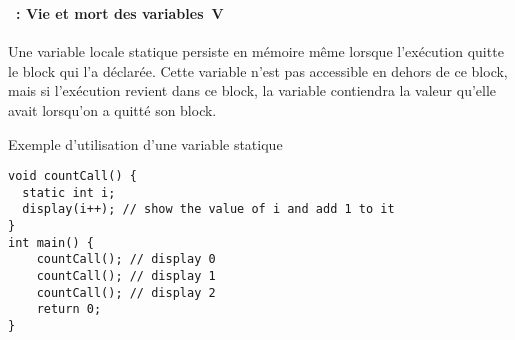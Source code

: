 \begin{frame}[containsverbatim]
  \frametitle{\secname}
  \framesubtitle{\subsecname~: Vie et mort des variables~V}
  
  {\small Une variable locale statique persiste en mémoire même lorsque l'exécution quitte le block qui l'a déclarée. 
  Cette variable n'est pas accessible en dehors de ce block, mais si l'exécution revient dans ce block, 
  la variable contiendra la valeur qu'elle avait lorsqu'on a quitté son block.}
  \begin{exampleblock}{Exemple d'utilisation d'une variable statique}
    {\small\begin{verbatim}
void countCall() {
  static int i;
  display(i++); // show the value of i and add 1 to it
}
int main() {
    countCall(); // display 0
    countCall(); // display 1
    countCall(); // display 2
    return 0;
}
    \end{verbatim}}
  \end{exampleblock}

\end{frame}

